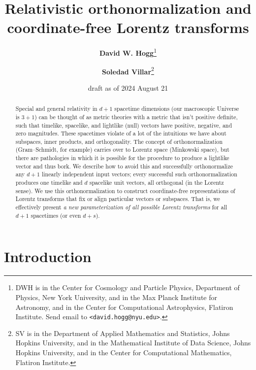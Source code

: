 \documentclass{article}
\title{\bfseries Relativistic orthonormalization and coordinate-free Lorentz transforms}
\author{\textbf{David W. Hogg}\footnote{DWH is in the Center for Cosmology and Particle Physics, Department of Physics, New York University, and in the Max Planck Institute for Astronomy, and in the Center for Computational Astrophysics, Flatiron Institute. Send email to \texttt{<david.hogg@nyu.edu>}.}
        \and
        \textbf{Soledad Villar}\footnote{SV is in the Department of Applied Mathematics and Statistics, Johns Hopkins University, and in the Mathematical Institute of Data Science, Johns Hopkins University, and in the Center for Computational Mathematics, Flatiron Institute.}}
\date{draft as of 2024 August 21}
\newcommand{\plus}{\!+\!} %
\begin{document}
\thispagestyle{plain}
\maketitle

\begin{abstract}\noindent
    Special and general relativity in $d\plus1$ spacetime dimensions (our macroscopic Universe is $3\plus1$) can be thought of as metric theories with a metric that isn't positive definite, such that timelike, spacelike, and lightlike (null) vectors have positive, negative, and zero magnitudes.
    These spacetimes violate of a lot of the intuitions we have about subspaces, inner products, and orthogonality.
    The concept of orthonormalization (Gram--Schmidt, for example) carries over to Lorentz space (Minkowski space), but there are pathologies in which it is possible for the procedure to produce a lightlike vector and thus bork.
    We describe how to avoid this and successfully orthonormalize any $d+1$ linearly independent input vectors; every successful such orthonormalization produces one timelike and $d$ spacelike unit vectors, all orthogonal (in the Lorentz sense).
    We use this orthonormalization to construct coordinate-free representations of Lorentz transforms that fix or align particular vectors or subspaces.
    That is, we effectively present \emph{a new parameterization of all possible Lorentz transforms} for all $d\plus1$ spacetimes (or even $d\plus s$).
\end{abstract}

\section{Introduction}\label{sec:intro}
\end{document}
